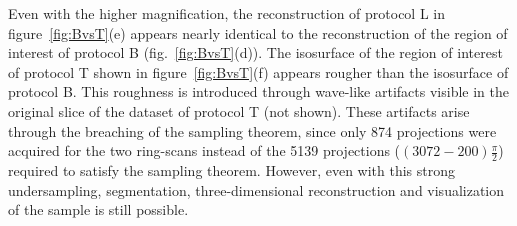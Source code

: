 Even with the higher magnification, the reconstruction of protocol L in figure~\ref{fig:BvsT}(e) appears nearly identical to the reconstruction of the region of interest of protocol B (fig.~\ref{fig:BvsT}(d)). The isosurface of the region of interest of protocol T shown in figure~\ref{fig:BvsT}(f) appears rougher than the isosurface of protocol B. This roughness is introduced through wave-like artifacts visible in the original slice of the dataset of protocol T (not shown). These artifacts arise through the breaching of the sampling theorem, since only 874 projections were acquired for the two ring-scans instead of the 5139 projections ($(3072-200)\frac{\pi}{2}$) required to satisfy the sampling theorem. However, even with this strong undersampling, segmentation, three-dimensional reconstruction and visualization of the sample is still possible.

